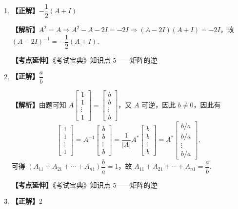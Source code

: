\documentclass[a4paper,11pt]{ctexart}
\begin{document}
\begin{enumerate}[label=\arabic*., leftmargin=2em, itemsep=0.75em, topsep=0.5em]
  \item \textbf{【正解】}$-\dfrac{1}{2}(A + I)$

  \textbf{【解析】}$A^2 = A \Rightarrow A^2 - A - 2I = -2I \Rightarrow (A - 2I)(A + I) = -2I$，故 $(A - 2I)^{-1} = -\dfrac{1}{2}(A + I)$.

  \textbf{【考点延伸】}《考试宝典》知识点 5——矩阵的逆

  \item \textbf{【正解】}$\dfrac{a}{b}$

  \textbf{【解析】}由题可知 $A \begin{bmatrix} 1 \\ 1 \\ \vdots \\ 1 \end{bmatrix} = \begin{bmatrix} b \\ b \\ \vdots \\ b \end{bmatrix}$，又 $A$ 可逆，因此 $b \neq 0$，因此有
  \[
    \begin{bmatrix} 1 \\ 1 \\ \vdots \\ 1 \end{bmatrix}
    = A^{-1} \begin{bmatrix} b \\ b \\ \vdots \\ b \end{bmatrix}
    = \frac{1}{|A|} A^* \begin{bmatrix} b \\ b \\ \vdots \\ b \end{bmatrix}
    = A^* \begin{bmatrix} b/a \\ b/a \\ \vdots \\ b/a \end{bmatrix},
  \]
  可得 $(A_{11} + A_{21} + \cdots + A_{n1}) \dfrac{b}{a} = 1$，故 $A_{11} + A_{21} + \cdots + A_{n1} = \dfrac{a}{b}$.

  \textbf{【考点延伸】}《考试宝典》知识点 5——矩阵的逆

  \item \textbf{【正解】}$2$


\end{enumerate}
\end{document}
